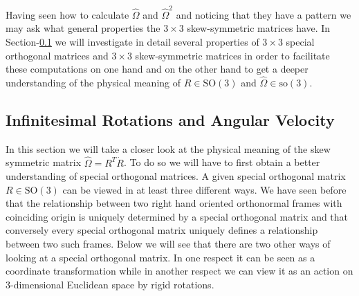 \documentclass[graybox,envcountchap,sectrefs]{svmonoMuga}
\begin{document}
Having seen how to calculate $\widehat{\Omega}$ and $\widehat{\Omega}^2$ and noticing that they have a pattern we may ask what general properties the $3\times 3$ skew-symmetric matrices have. In Section-\ref{Secn:PropertiesOfRotations} we will investigate in detail several properties of $3\times 3$ special orthogonal matrices and $3\times 3$ skew-symmetric matrices in order to facilitate these computations on one hand and on the other hand 
to get a deeper understanding of the physical meaning of $R\in \mathrm{SO}(3)$ and $\widehat{\Omega}\in \mathrm{so}(3)$.


\subsection{Infinitesimal Rotations and Angular Velocity}\label{Secn:PropertiesOfRotations}
In this section we will take a closer look at the physical meaning of the skew symmetric matrix $\widehat{\Omega}=R^T\dot{R}$. To do so we will have to first obtain a better understanding of special orthogonal matrices. A given special orthogonal matrix $R\in \mathrm{SO}(3)$ can be viewed in at least three different ways. We have seen before that the relationship between two right hand oriented orthonormal frames with coinciding origin is uniquely determined by a special orthogonal matrix and that conversely every special orthogonal matrix uniquely defines a relationship between two such frames. Below we will see that there are two other ways of looking at a special orthogonal matrix. In one respect it can be seen as a coordinate transformation while in another respect we can view it as an action on 3-dimensional Euclidean space by rigid rotations.
\end{document}
